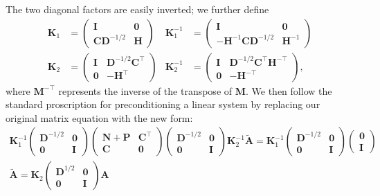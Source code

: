 The two diagonal factors are easily inverted; we further define
\begin{align}
\mathbf{K}_1 &=
\begin{pmatrix}
\mathbf{I} & \mathbf{0}\\
\mathbf{C} \mathbf{D}^{-1/2} & \mathbf{H}
\end{pmatrix}
&
\mathbf{K}_1^{-1} &=
\begin{pmatrix}
\mathbf{I} & \mathbf{0}\\
-\mathbf{H}^{-1}\mathbf{CD}^{-1/2} & \mathbf{H}^{-1}
\end{pmatrix}\\
\mathbf{K}_2 &=
\begin{pmatrix}
\mathbf{I} & \mathbf{D}^{-1/2}\mathbf{C}^\top\\
\mathbf{0} & -\mathbf{H}^\top
\end{pmatrix}
&
\mathbf{K}_2^{-1} &=
\begin{pmatrix}
\mathbf{I} & \mathbf{D}^{-1/2}\mathbf{C}^\top \mathbf{H}^{-\top}\\
\mathbf{0} & -\mathbf{H}^{-\top}
\end{pmatrix},
\end{align}
where $\mathbf{M}^{-\top}$ represents the inverse of the transpose of $\mathbf{M}$.  We then follow the standard proscription for preconditioning a linear system by replacing our original matrix equation with the new form:
\begin{gather*}
\mathbf{K}_1^{-1} \begin{pmatrix}\mathbf{D}^{-1/2}&\mathbf{0}\\ \mathbf{0}&\mathbf{I}\end{pmatrix}
\begin{pmatrix}
\mathbf{N}+\mathbf{P} & \mathbf{C}^\top \\
\mathbf{C} & \mathbf{0}
\end{pmatrix}
\begin{pmatrix}\mathbf{D}^{-1/2}&\mathbf{0}\\ \mathbf{0}&\mathbf{I}\end{pmatrix} \mathbf{K}_2^{-1} \mathbf{\widetilde{A}} = 
\mathbf{K}_1^{-1} \begin{pmatrix}\mathbf{D}^{-1/2}&\mathbf{0}\\\mathbf{0}&\mathbf{I}\end{pmatrix} \begin{pmatrix}\mathbf{0}\\ \mathbf{I}\end{pmatrix}\\
\mathbf{\widetilde{A}} = \mathbf{K}_2 \begin{pmatrix}\mathbf{D}^{1/2} & \mathbf{0}\\ \mathbf{0} & \mathbf{I}\end{pmatrix}\mathbf{A}
\end{gather*}
